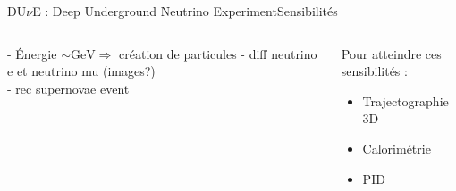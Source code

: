     \begin{frame}{DU$\nu$E : Deep Underground Neutrino Experiment}{Sensibilités}
        \begin{scriptsize}
            \begin{columns}
                \begin{column}{0.6\textwidth}
                    - Énergie $\sim \si{\giga\eV}\Rightarrow$ création de particules
                    - diff neutrino e et neutrino mu (images?)\\ 
                    - rec supernovae event
                \end{column}
                 \begin{column}{0.4\textwidth}
                    \begin{scriptsize}
                        Pour atteindre ces sensibilités : \\
                    \end{scriptsize}
                    \begin{itemize}
                        \item Trajectographie 3D
                        \item Calorimétrie
                        \item PID
                    \end{itemize}
                \end{column}
            \end{columns}
        \end{scriptsize}
    \end{frame}

